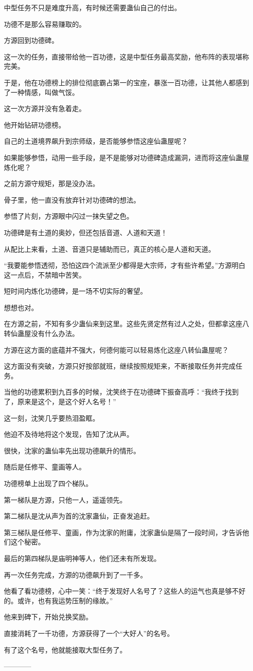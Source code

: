 \begin{this_body}
中型任务不只是难度升高，有时候还需要蛊仙自己的付出。

功德不是那么容易赚取的。

方源回到功德碑。

这一次的任务，直接带给他一百功德，这是中型任务最高奖励，他布阵的表现堪称完美。

于是，他在功德榜上的排位彻底霸占第一的宝座，暴涨一百功德，让其他人都感到了一种情感，叫做气馁。

这一次方源并没有急着走。

他开始钻研功德榜。

自己的土道境界飙升到宗师级，是否能够参悟这座仙蛊屋呢？

如果能够参悟，动用一些手段，是不是能够对功德碑造成漏洞，进而将这座仙蛊屋炼化呢？

之前方源守规矩，那是没办法。

骨子里，他一直没有放弃针对功德碑的想法。

参悟了片刻，方源眼中闪过一抹失望之色。

功德碑是有土道的奥妙，但还包括音道、人道和天道！

从配比上来看，土道、音道只是辅助而已，真正的核心是人道和天道。

“我要能参悟透彻，恐怕这四个流派至少都得是大宗师，才有些许希望。”方源明白这一点后，不禁暗中苦笑。

短时间内炼化功德碑，是一场不切实际的奢望。

想想也对。

在方源之前，不知有多少蛊仙来到这里。这些先贤定然有过人之处，但都拿这座八转仙蛊屋没有什么办法。

方源在这方面的底蕴并不强大，何德何能可以轻易炼化这座八转仙蛊屋呢？

这方面没有突破，方源只好按部就班，继续按照规矩来，不断接取任务并完成任务。

当他的功德累积到九百多的时候，沈笑终于在功德碑下振奋高呼：“我终于找到了，原来是这个，是这个好人名号！”

这一刻，沈笑几乎要热泪盈眶。

他迫不及待地将这个发现，告知了沈从声。

很快，沈家的蛊仙率先出现功德飙升的情形。

随后是任修平、童画等人。

功德榜单上出现了四个梯队。

第一梯队是方源，只他一人，遥遥领先。

第二梯队是沈从声为首的沈家蛊仙，正奋发追赶。

第三梯队是任修平、童画，作为沈家的附庸，沈家蛊仙是隔了一段时间，才告诉他们这个秘密。

最后的第四梯队是庙明神等人，他们还未有所发现。

再一次任务完成，方源的功德飙升到了一千多。

他看了看功德榜，心中一笑：“终于发现好人名号了？这些人的运气也真是够不好的。或许，也有我运势压制的缘故。”

他来到碑下，开始兑换奖励。

直接消耗了一千功德，方源获得了一个“大好人”的名号。

有了这个名号，他就能接取大型任务了。

------------

\end{this_body}

